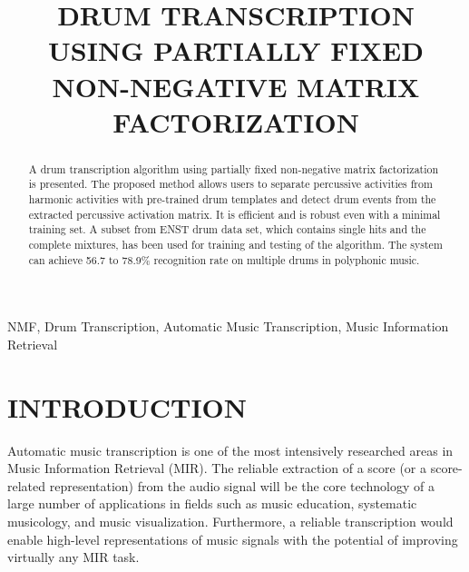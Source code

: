 \documentclass{article}
\title{DRUM TRANSCRIPTION USING PARTIALLY FIXED NON-NEGATIVE MATRIX FACTORIZATION}
\begin{document}
%
\maketitle
%
\begin{abstract}
A drum transcription algorithm using partially fixed non-negative matrix factorization is presented. The proposed method allows users to separate percussive activities from harmonic activities with pre-trained drum templates and detect drum events from the extracted percussive activation matrix. It is efficient and is robust even with a minimal training set.
A subset from ENST drum data set, which contains single hits and the complete mixtures, has been used for training and testing of the algorithm. 
The system can achieve 56.7 to 78.9\% recognition rate on multiple drums in polyphonic music. 
\end{abstract}
%
\begin{keywords}
NMF, Drum Transcription, Automatic Music Transcription, Music Information Retrieval
\end{keywords}
%
\section{INTRODUCTION}\label{sec:introduction}
Automatic music transcription is one of the most intensively researched areas in Music Information Retrieval (MIR). The reliable extraction of a score (or a score-related representation) from the audio signal will be the core technology of a large number of applications in fields such as music education, systematic musicology, and music visualization. Furthermore, a reliable transcription would enable high-level representations of music signals with the potential of improving virtually any MIR task.

\end{document}
